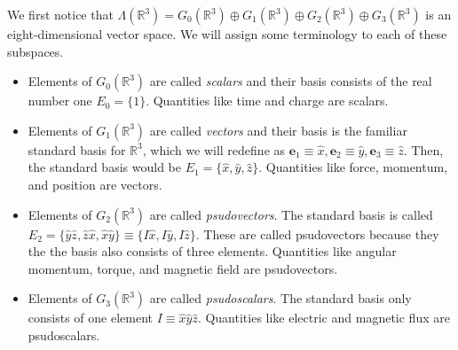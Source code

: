 \documentclass{article}
\numberwithin{equation}{section}
\newcommand{\R}{\mathbb{R}}
\newcommand{\ve}{\mathbf}
\begin{document}
We first notice that $\Lambda(\R^3)=G_0(\R^3)\oplus G_1(\R^3)\oplus G_2(\R^3)\oplus G_3(\R^3)$ is an eight-dimensional vector space. We will assign some terminology to each of these subspaces.
\begin{itemize}
    \item Elements of $G_0(\R^3)$ are called \textit{scalars} and their basis consists of the real number one $E_0=\{1\}$. Quantities like time and charge are scalars.
    \item Elements of $G_1(\R^3)$ are called \textit{vectors} and their basis is the familiar standard basis for $\R^3$, which we will redefine as $\ve e_1\equiv \hat x,\ve e_2\equiv \hat y,\ve e_3\equiv \hat z$. Then, the standard basis would be $E_1=\{\hat x,\hat y,\hat z\}$. Quantities like force, momentum, and position are vectors.
    \item Elements of $G_2(\R^3)$ are called \textit{psudovectors}. The standard basis is called $E_2=\{\hat y\hat z, \hat z\hat x, \hat x\hat y\}\equiv\{I\hat x,I\hat y,I\hat z\}$. These are called psudovectors because they the the basis also consists of three elements. Quantities like angular momentum, torque, and magnetic field are psudovectors.
    \item Elements of $G_3(\R^3)$ are called \textit{psudoscalars}. The standard basis only consists of one element $I\equiv \hat x\hat y\hat z$. Quantities like electric and magnetic flux are psudoscalars.
\end{itemize}
\end{document}
